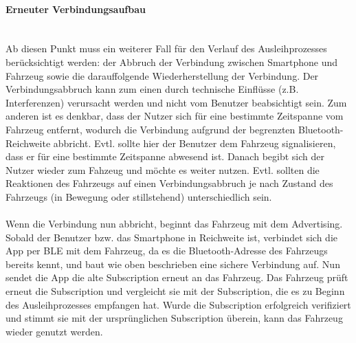 \paragraph{Erneuter Verbindungsaufbau} \mbox{} \vspace{0.2cm} \\
Ab diesen Punkt muss ein weiterer Fall für den Verlauf des Ausleihprozesses berücksichtigt werden: der Abbruch der Verbindung zwischen Smartphone und Fahrzeug sowie die darauffolgende Wiederherstellung der Verbindung. Der Verbindungsabbruch kann zum einen durch technische Einflüsse (z.B. Interferenzen) verursacht werden und nicht vom Benutzer beabsichtigt sein. Zum anderen ist es denkbar, dass der Nutzer sich für eine bestimmte Zeitspanne vom Fahrzeug entfernt, wodurch die Verbindung aufgrund der begrenzten Bluetooth-Reichweite abbricht. Evtl. sollte hier der Benutzer dem Fahrzeug signalisieren, dass er für eine bestimmte Zeitspanne abwesend ist. Danach begibt sich der Nutzer wieder zum Fahzeug und möchte es weiter nutzen. Evtl. sollten die Reaktionen des Fahrzeugs auf einen Verbindungsabbruch je nach Zustand des Fahrzeugs (in Bewegung oder stillstehend) unterschiedlich sein.
\\\\
Wenn die Verbindung nun abbricht, beginnt das Fahrzeug mit dem Advertising. Sobald der Benutzer bzw. das Smartphone in Reichweite ist, verbindet sich die App per BLE mit dem Fahrzeug, da es die Bluetooth-Adresse des Fahrzeugs bereits kennt, und baut wie oben beschrieben eine sichere Verbindung auf. Nun sendet die App die alte Subscription erneut an das Fahrzeug. Das Fahrzeug prüft erneut die Subscription und vergleicht sie mit der Subscription, die es zu Beginn des Ausleihprozesses empfangen hat. Wurde die Subscription erfolgreich verifiziert und stimmt sie mit der ursprünglichen Subscription überein, kann das Fahrzeug wieder genutzt werden.